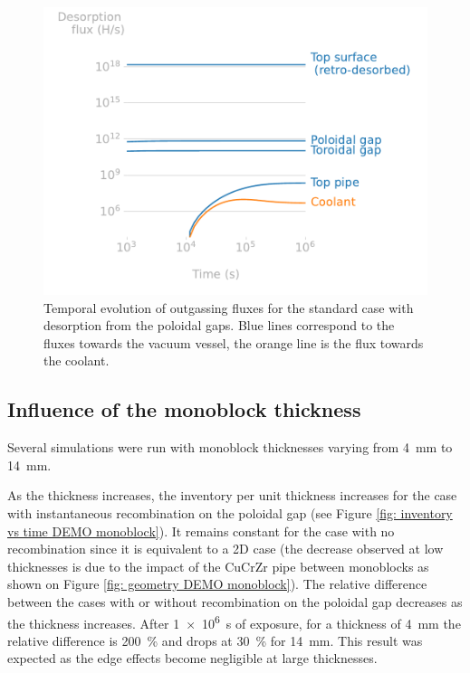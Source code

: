 \begin{figure} [h]
    \centering
    \includegraphics[width=\linewidth]{Figures/Chapter3/monoblocks/3D_monoblocks/desorption_flux_standard_case.pdf}
    \caption{Temporal evolution of outgassing fluxes for the standard case with desorption from the poloidal gaps. Blue lines correspond to the fluxes towards the vacuum vessel, the orange line is the flux towards the coolant.}
    \label{fig: fluxes DEMO monoblock}
\end{figure}

\subsection{Influence of the monoblock thickness}

Several simulations were run with monoblock thicknesses varying from \SI{4}{mm} to \SI{14}{mm}.

As the thickness increases, the inventory per unit thickness increases for the case with instantaneous recombination on the poloidal gap (see Figure \ref{fig: inventory vs time DEMO monoblock}).
It remains constant for the case with no recombination since it is equivalent to a 2D case (the decrease observed at low thicknesses is due to the impact of the CuCrZr pipe between monoblocks as shown on Figure \ref{fig: geometry DEMO monoblock}).
The relative difference between the cases with or without recombination on the poloidal gap decreases as the thickness increases.
After \SI{1e6}{s} of exposure, for a thickness of \SI{4}{mm} the relative difference is \SI{200}{\%} and drops at \SI{30}{\%} for \SI{14}{mm}.
This result was expected as the edge effects become negligible at large thicknesses.

